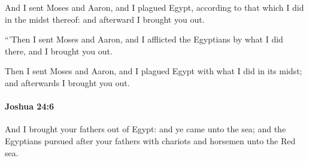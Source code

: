 			\begin{versebox}
					\item[BHS] 
					\item[ASV] And I sent Moses and Aaron, and I plagued Egypt, according to that which I did in the midst thereof: and afterward I brought you out.
					\item[NIV] “’Then I sent Moses and Aaron, and I afflicted the Egyptians by what I did there, and I brought you out.
					\item[NRSV] Then I sent Moses and Aaron, and I plagued Egypt with what I did in its midst; and afterwards I brought you out.
			\end{versebox}

		\paragraph{Joshua 24:6} %
			\label{JOSHUA-24-6}

			And I brought your fathers out of Egypt: and ye came unto the sea; and the Egyptians pursued after your fathers with chariots and horsemen unto the Red sea.

